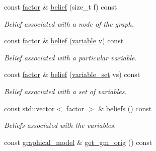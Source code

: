 \begin{DoxyCompactItemize}
const \hyperlink{classmerlin_1_1factor}{factor} \& \hyperlink{classmerlin_1_1ijgp_a43ba4b5f66a27881b8b6d4a0fed23b3f}{belief} (size\+\_\+t f) const 
\begin{DoxyCompactList}\small\item\em Belief associated with a node of the graph. \end{DoxyCompactList}\item 
const \hyperlink{classmerlin_1_1factor}{factor} \& \hyperlink{classmerlin_1_1ijgp_a950771f418c3fa8980e449c1b081a9cc}{belief} (\hyperlink{classmerlin_1_1variable}{variable} v) const 
\begin{DoxyCompactList}\small\item\em Belief associated with a particular variable. \end{DoxyCompactList}\item 
const \hyperlink{classmerlin_1_1factor}{factor} \& \hyperlink{classmerlin_1_1ijgp_a5506025b0268f56419a472d674faa476}{belief} (\hyperlink{classmerlin_1_1variable__set}{variable\+\_\+set} vs) const 
\begin{DoxyCompactList}\small\item\em Belief associated with a set of variables. \end{DoxyCompactList}\item 
const std\+::vector$<$ \hyperlink{classmerlin_1_1factor}{factor} $>$ \& \hyperlink{classmerlin_1_1ijgp_a031930b83efb5b52a5af5387a18ee0e2}{beliefs} () const 
\begin{DoxyCompactList}\small\item\em Beliefs associated with the variables. \end{DoxyCompactList}\item 
const \hyperlink{classmerlin_1_1graphical__model}{graphical\+\_\+model} \& \hyperlink{classmerlin_1_1ijgp_ac71678e2b148ae0d6b854e07505107fd}{get\+\_\+gm\+\_\+orig} () const \hypertarget{classmerlin_1_1ijgp_ac71678e2b148ae0d6b854e07505107fd}{}\label{classmerlin_1_1ijgp_ac71678e2b148ae0d6b854e07505107fd}


\end{DoxyCompactItemize}
